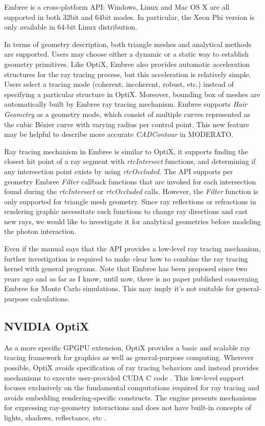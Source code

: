 Embree is a cross-platform API: Windows, Linux and Mac OS X are all supported in both 32bit and 64bit modes. In particular, the Xeon Phi version is only available in 64-bit Linux distribution.

In terms of geometry description, both triangle meshes and analytical methods are supported. Users may choose either a dynamic or a static way to establish geometry primitives. Like OptiX, Embree also provides automatic acceleration structures for the ray tracing process, but this acceleration is relatively simple. Users select a tracing mode (coherent, incoherent, robust, etc.) instead of specifying a particular structure in OptiX. Moreover, bounding box of meshes are automatically built by Embree ray tracing mechanism. Embree supports \textit{Hair Geometry} as a geometry mode, which consist of multiple curves represented as the cubic Bézier curve with varying radius per control point. This new feature may be helpful to describe more accurate \textit{CADContour} in MODERATO.

Ray tracing mechanism in Embree is similar to OptiX, it supports finding the closest hit point of a ray segment with \textit{rtcIntersect} functions, and determining if any intersection point exists by using \textit{rtcOccluded}. The API supports per geometry Embree \textit{Filter} callback functions that are invoked for each intersection found during the \textit{rtcIntersect} or \textit{rtcOccluded} calls. However, the \textit{Filter} function is only supported for triangle mesh geometry. Since ray reflections or refractions in rendering graphic necessitate such functions to change ray directions and cast new rays, we would like to investigate it for analytical geometries before modeling the photon interaction.

Even if the manual says that the API provides a low-level ray tracing mechanism, further investigation is required to make clear how to combine the ray tracing kernel with general programs. Note that Embree has been proposed since two years ago and as far as I know, until now, there is no paper published concerning Embree for Monte Carlo simulations. This may imply it's not suitable for general-purpose calculations.

\subsection{NVIDIA OptiX}
As a more specific GPGPU extension, OptiX provides a basic and scalable ray tracing framework for graphics as well as general-purpose computing. Wherever possible, OptiX avoids specification of ray tracing behaviors and instead provides mechanisms to execute user-provided CUDA C code \citep{Reference6}. This low-level support focuses exclusively on the fundamental computations required for ray tracing and avoids embedding rendering-specific constructs. The engine presents mechanisms for expressing ray-geometry interactions and does not have built-in concepts of lights, shadows, reflectance, etc \citep{Parker10OptiX}.

